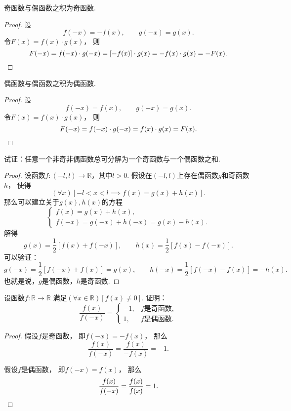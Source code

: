 \begin{property}
奇函数与偶函数之积为奇函数.
\begin{proof}
设\[
	f(-x) = -f(x),
	\qquad
	g(-x) = g(x).
\]
令\(F(x) = f(x) \cdot g(x)\)，
则\[
	F(-x) = f(-x) \cdot g(-x)
	= [-f(x)] \cdot g(x)
	= - f(x) \cdot g(x)
	= - F(x).
	\qedhere
\]
\end{proof}
\end{property}

\begin{property}
偶函数与偶函数之积为偶函数.
\begin{proof}
设\[
	f(-x) = f(x),
	\qquad
	g(-x) = g(x).
\]
令\(F(x) = f(x) \cdot g(x)\)，
则\[
	F(-x) = f(-x) \cdot g(-x)
	= f(x) \cdot g(x)
	= F(x).
	\qedhere
\]
\end{proof}
\end{property}

\begin{example}\label{example:函数.任一函数可拆为奇偶函数之和}
试证：任意一个非奇非偶函数总可分解为一个奇函数与一个偶函数之和.
\begin{proof}
设函数\(f\colon(-l,l)\to\mathbb{R}\)，其中\(l>0\).
假设在\((-l,l)\)上存在偶函数\(g\)和奇函数\(h\)，
使得\[
	(\forall x)
	[-l<x<l \implies f(x) = g(x)+h(x)].
\]
那么可以建立关于\(g(x),h(x)\)的方程\[
	\left\{ \begin{array}{l}
		f(x) = g(x) + h(x), \\
		f(-x) = g(-x) + h(-x) = g(x) - h(x).
	\end{array} \right.
\]
解得\[
	g(x) = \frac12 [f(x) + f(-x)], \qquad
	h(x) = \frac12 [f(x) - f(-x)].
\]
可以验证：\[
	g(-x) = \frac12 [f(-x) + f(x)] = g(x), \qquad
	h(-x) = \frac12 [f(-x) - f(x)] = -h(x).
\]
也就是说，\(g\)是偶函数，\(h\)是奇函数.
\end{proof}
\end{example}

\begin{example}
设函数\(f\colon\mathbb{R}\to\mathbb{R}\)
满足\((\forall x\in\mathbb{R})[f(x)\neq0]\).
证明：\[
	\frac{f(x)}{f(-x)} = \left\{ \begin{array}{rl}
		-1, & \text{$f$是奇函数}, \\
		1, & \text{$f$是偶函数}.
	\end{array} \right.
\]
\begin{proof}
假设\(f\)是奇函数，
即\(f(-x)=-f(x)\)，
那么\[
	\frac{f(x)}{f(-x)}
	=\frac{f(x)}{-f(x)}
	=-1.
\]

假设\(f\)是偶函数，
即\(f(-x)=f(x)\)，
那么\[
	\frac{f(x)}{f(-x)}
	=\frac{f(x)}{f(x)}
	=1.
	\qedhere
\]
\end{proof}
\end{example}

